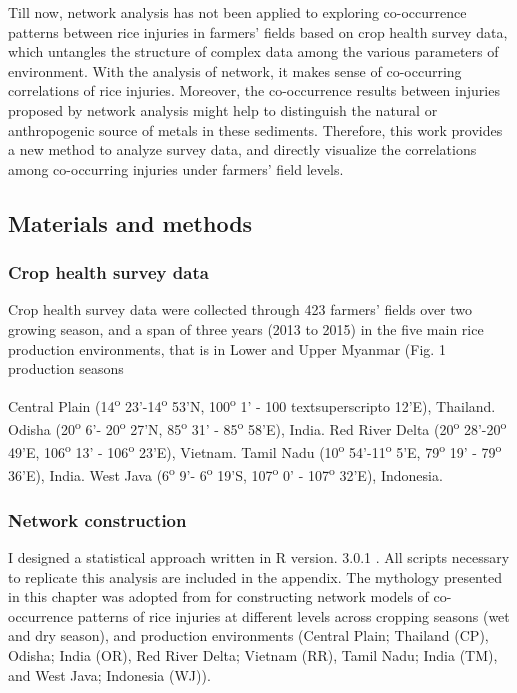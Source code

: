 Till now, network analysis has not been applied to exploring co-occurrence patterns between rice injuries in farmers’ fields based on crop health survey data, which untangles the structure of complex data among the various parameters of environment. With the analysis of network, it makes sense of co-occurring correlations of rice injuries. Moreover, the co-occurrence results between injuries proposed by network analysis might help to distinguish the natural or anthropogenic source of metals in these sediments. Therefore, this work provides a new method to analyze survey data, and directly visualize the correlations among co-occurring injuries under farmers’ field levels.

\subsection{Materials and methods} 

\subsubsection{Crop health survey data}
Crop health survey data were collected through 423 farmers’ fields over two growing season, and a span of three years (2013 to 2015) in the five main rice production environments, that is in Lower and Upper Myanmar (Fig. 1
production seasons 

Central Plain (14\textsuperscript{o} 23’-14\textsuperscript{o} 53’N, 100\textsuperscript{o} 1’ - 100 textsuperscript{o} 12’E), Thailand.
Odisha (20\textsuperscript{o} 6’- 20\textsuperscript{o} 27’N, 85\textsuperscript{o} 31’ - 85\textsuperscript{o} 58’E), India.
Red River Delta (20\textsuperscript{o} 28’-20\textsuperscript{o} 49’E, 106\textsuperscript{o} 13’ - 106\textsuperscript{o}  23’E), Vietnam.
Tamil Nadu (10\textsuperscript{o} 54’-11\textsuperscript{o} 5’E, 79\textsuperscript{o} 19’ - 79\textsuperscript{o}  36’E), India.
West Java (6\textsuperscript{o} 9’- 6\textsuperscript{o} 19’S, 107\textsuperscript{o} 0’ - 107\textsuperscript{o}  32’E), Indonesia.


\subsubsection{Network construction}
I designed a statistical approach written in R version. 3.0.1 \citep{R_2015}. All scripts necessary to replicate this analysis are included in the appendix. The mythology presented in this chapter was adopted from \citet{Williams_2014_demonstrating} for constructing network models of co-occurrence patterns of rice injuries at different levels across cropping seasons (wet and dry season), and production environments (Central Plain; Thailand (CP), Odisha; India (OR), Red River Delta; Vietnam (RR), Tamil Nadu; India (TM), and West Java; Indonesia (WJ)). 

